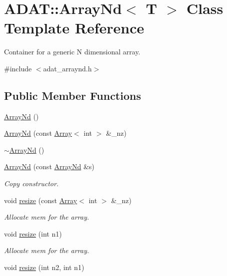 \hypertarget{classADAT_1_1ArrayNd}{}\section{A\+D\+AT\+:\+:Array\+Nd$<$ T $>$ Class Template Reference}
\label{classADAT_1_1ArrayNd}


Container for a generic N dimensional array.  




{\ttfamily \#include $<$adat\+\_\+arraynd.\+h$>$}

\subsection*{Public Member Functions}
\begin{DoxyCompactItemize}
\item 
\mbox{\hyperlink{classADAT_1_1ArrayNd_aafdf6b588aa54b3d59b6952971bcdce4}{Array\+Nd}} ()
\item 
\mbox{\hyperlink{classADAT_1_1ArrayNd_aea668cd9a67b06d552e4acb9a7dec98c}{Array\+Nd}} (const \mbox{\hyperlink{classXMLArray_1_1Array}{Array}}$<$ int $>$ \&\+\_\+nz)
\item 
\mbox{\hyperlink{classADAT_1_1ArrayNd_a040990cb205b2c2b5eb2f5d0594408b9}{$\sim$\+Array\+Nd}} ()
\item 
\mbox{\hyperlink{classADAT_1_1ArrayNd_a8aec6c75f499b938b8702d4eab1699b8}{Array\+Nd}} (const \mbox{\hyperlink{classADAT_1_1ArrayNd}{Array\+Nd}} \&s)
\begin{DoxyCompactList}\small\item\em Copy constructor. \end{DoxyCompactList}\item 
void \mbox{\hyperlink{classADAT_1_1ArrayNd_afcf13cf80c4cb861316d1ad55601818e}{resize}} (const \mbox{\hyperlink{classXMLArray_1_1Array}{Array}}$<$ int $>$ \&\+\_\+nz)
\begin{DoxyCompactList}\small\item\em Allocate mem for the array. \end{DoxyCompactList}\item 
void \mbox{\hyperlink{classADAT_1_1ArrayNd_a31eb805d0f039712a9b83609dd828d91}{resize}} (int n1)
\begin{DoxyCompactList}\small\item\em Allocate mem for the array. \end{DoxyCompactList}\item 
void \mbox{\hyperlink{classADAT_1_1ArrayNd_ac66a29c373d99ae8ead2344c1024489e}{resize}} (int n2, int n1)

\end{DoxyCompactItemize}
